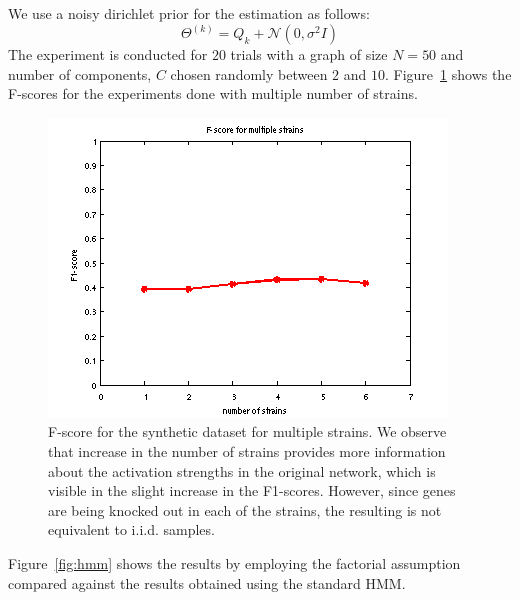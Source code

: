 \documentclass{bioinfo}
\begin{document}
We use a noisy dirichlet prior for the estimation as follows: 
\begin{equation}
  \label{eq:exp1_prior}
\Theta^{(k)}  = Q_{k} + {\mathcal N}(0, \sigma^{2} I)   
\end{equation}
The experiment is conducted for $20$ trials with a graph of size
$N=50$ and number of components, $C$ chosen randomly between $2$ and
$10$. Figure~\ref{fig:exp1_fig} shows the F-scores for the
experiments done with multiple number of strains. 
 \begin{figure}[h]
   \centering
     \includegraphics[scale=0.75]{results/Fig1_2}
   \caption{F-score for the synthetic dataset for multiple strains. We
     observe that increase in the number of strains provides more
     information about the activation strengths in the original
     network, which is visible in the slight increase in the
     F1-scores. However, since genes are being knocked out in each of
     the strains, the resulting is not equivalent to i.i.d. samples.  
   }
   \label{fig:exp1_fig}
 \end{figure}
Figure~\ref{fig:hmm} shows the results by employing the factorial
assumption compared against the results obtained using the standard
HMM. 
\end{document}
